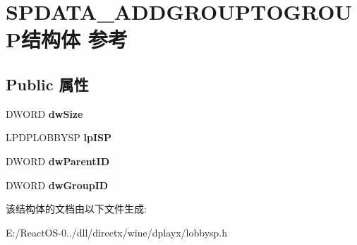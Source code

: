 \hypertarget{struct_s_p_d_a_t_a___a_d_d_g_r_o_u_p_t_o_g_r_o_u_p}{}\section{S\+P\+D\+A\+T\+A\+\_\+\+A\+D\+D\+G\+R\+O\+U\+P\+T\+O\+G\+R\+O\+U\+P结构体 参考}
\label{struct_s_p_d_a_t_a___a_d_d_g_r_o_u_p_t_o_g_r_o_u_p}
\subsection*{Public 属性}
\begin{DoxyCompactItemize}
\item 
\mbox{\label{struct_s_p_d_a_t_a___a_d_d_g_r_o_u_p_t_o_g_r_o_u_p_a900848093985014d270a636cf68e52a8}} 
D\+W\+O\+RD {\bfseries dw\+Size}
\item 
\mbox{\label{struct_s_p_d_a_t_a___a_d_d_g_r_o_u_p_t_o_g_r_o_u_p_a865388a72802de7aa7ab121b37d2e574}} 
L\+P\+D\+P\+L\+O\+B\+B\+Y\+SP {\bfseries lp\+I\+SP}
\item 
\mbox{\label{struct_s_p_d_a_t_a___a_d_d_g_r_o_u_p_t_o_g_r_o_u_p_aeec436338699b78f7666a10f215b6386}} 
D\+W\+O\+RD {\bfseries dw\+Parent\+ID}
\item 
\mbox{\label{struct_s_p_d_a_t_a___a_d_d_g_r_o_u_p_t_o_g_r_o_u_p_ab58cdf22e66c2e235551c82d7f7980c9}} 
D\+W\+O\+RD {\bfseries dw\+Group\+ID}
\end{DoxyCompactItemize}


该结构体的文档由以下文件生成\+:\begin{DoxyCompactItemize}
\item 
E\+:/\+React\+O\+S-\/0../dll/directx/wine/dplayx/lobbysp.\+h\end{DoxyCompactItemize}
